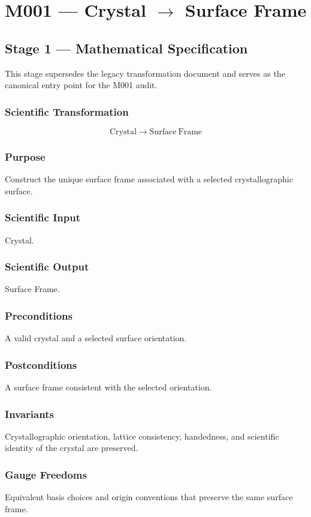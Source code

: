 
\chapter{M001 --- Crystal $\rightarrow$ Surface Frame}

\section{Stage 1 --- Mathematical Specification}

This stage supersedes the legacy transformation document and serves as the
canonical entry point for the M001 audit.

\subsection{Scientific Transformation}

\[
\mathrm{Crystal} \longrightarrow \mathrm{Surface\ Frame}
\]

\subsection{Purpose}

Construct the unique surface frame associated with a selected crystallographic
surface.

\subsection{Scientific Input}

Crystal.

\subsection{Scientific Output}

Surface Frame.

\subsection{Preconditions}

A valid crystal and a selected surface orientation.

\subsection{Postconditions}

A surface frame consistent with the selected orientation.

\subsection{Invariants}

Crystallographic orientation, lattice consistency, handedness, and scientific
identity of the crystal are preserved.

\subsection{Gauge Freedoms}

Equivalent basis choices and origin conventions that preserve the same surface
frame.
